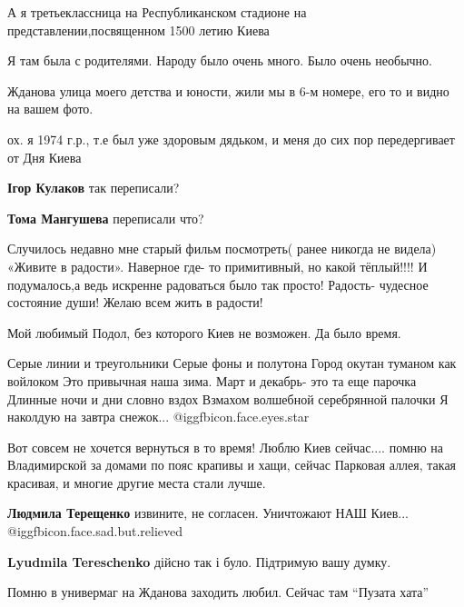 \begin{itemize}
А я третьеклассница на Республиканском стадионе на представлении,посвященном 1500 летию Киева

Я там была с родителями. Народу было очень много. Было очень необычно.

Жданова улица моего детства и юности, жили мы в 6-м номере, его то и видно на вашем фото.

ох. я 1974 г.р., т.е был уже здоровым дядьком, и меня до сих пор передергивает
от Дня Киева

\begin{itemize} %
\textbf{Ігор Кулаков} так переписали?

\textbf{Тома Мангушева} переписали что?
\end{itemize} %


Случилось недавно мне старый фильм посмотреть( ранее никогда не видела) «Живите
в радости». Наверное где- то примитивный, но какой тёплый!!!! И подумалось,а
ведь искренне радоваться было так просто! Радость- чудесное состояние души!
Желаю всем жить в радости!

Мой любимый Подол, без которого Киев не возможен. Да было время.


\obeycr
Серые линии и треугольники
Серые фоны и полутона
Город окутан туманом как войлоком
Это привычная наша зима.
Март и декабрь- это та еще парочка
Длинные ночи и дни словно вздох
Взмахом волшебной серебрянной палочки
Я наколдую на завтра снежок... @igg{fbicon.face.eyes.star} 
\restorecr


Вот совсем не хочется вернуться в то время! Люблю Киев сейчас.... помню на
Владимирской за домами по пояс крапивы и хащи, сейчас Парковая аллея, такая
красивая, и многие другие места стали лучше.

\begin{itemize} %
\textbf{Людмила Терещенко} извините, не согласен. Уничтожают НАШ Киев... @igg{fbicon.face.sad.but.relieved} 

\textbf{Lyudmila Tereschenko} дійсно так і було. Підтримую вашу думку.
\end{itemize} %

Помню в универмаг на Жданова заходить любил. Сейчас там \enquote{Пузата хата}


\end{itemize}
